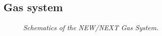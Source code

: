 %


%


\subsection{Gas system}

\begin{figure}[hpt!]
    \bigskip
    \begin{center}\leavevmode
        \caption{\textit{Schematics of the NEW/NEXT Gas System.}}
        \label{fig.GasSystem}
    \end{center}
\end{figure}

